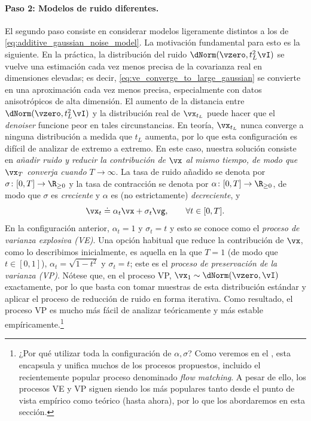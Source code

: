 \documentclass[../../book-main.tex]{subfiles}
\begin{document}
\paragraph{Paso 2: Modelos de ruido diferentes.} El segundo paso consiste en
considerar modelos ligeramente distintos a los de
\eqref{eq:additive_gaussian_noise_model}. La motivación fundamental para
esto es la siguiente. En la práctica, la distribución del ruido
\(\dNorm(\vzero, t_{L}^{2}\vI)\) se vuelve una estimación cada vez
menos precisa de la covarianza real en dimensiones elevadas; es decir,
\eqref{eq:ve_converge_to_large_gaussian} se convierte en una aproximación cada vez
menos precisa, especialmente con datos anisotrópicos de alta dimensión.
El aumento de la distancia entre \(\dNorm(\vzero, t_{L}^{2}\vI)\)
y la distribución real de \(\vx_{t_{L}}\) puede hacer que el \textit{denoiser}
funcione peor en tales circunstancias. En teoría,
\(\vx_{t_{L}}\) nunca converge a ninguna distribución a medida que \(t_{L}\)
aumenta, por lo que esta configuración es difícil de analizar de extremo a extremo. En este
caso, nuestra solución consiste en \textit{añadir ruido y reducir
    la contribución de \(\vx\) al mismo tiempo, de modo que \(\vx_{T}\) converja cuando \(T \to \infty\)}. 
La tasa de ruido añadido se denota por \(\sigma \colon [0, T] \to \R_{\geq 0}\) y la tasa de 
contracción se denota por \(\alpha \colon [0, T] \to \R_{\geq 0}\), de modo que \(\sigma\) es
\textit{creciente} y \(\alpha\) es (no estrictamente) \textit{decreciente}, y
\begin{equation}\label{eq:gen_additive_gaussian_noise_model}
    \vx_{t} \doteq \alpha_{t}\vx + \sigma_{t}\vg, \qquad \forall t \in [0, T].
\end{equation}
En la configuración anterior, \(\alpha_{t} = 1\) y \(\sigma_{t} = t\) y
esto se conoce como el \textit{proceso de varianza explosiva (VE)}. Una
opción habitual que reduce la contribución de \(\vx\), como lo
describimos inicialmente, es aquella en la que \(T = 1\) (de modo que \(t \in [0, 1]\)),
\(\alpha_{t} = \sqrt{1 - t^{2}}\) y \(\sigma_{t} = t\); este es el
\textit{proceso de preservación de la varianza (VP)}. Nótese que, en el proceso VP,
\(\vx_{1} \sim \dNorm(\vzero, \vI)\) exactamente, por lo que basta con
tomar muestras de esta distribución estándar y aplicar el proceso de reducción 
de ruido en forma iterativa. Como
resultado, el proceso VP es mucho más fácil de analizar teóricamente y
más estable empíricamente.\footnote{¿Por qué utilizar toda la configuración de \(\alpha,
    \sigma\)? Como veremos en el
    , esta encapsula y
    unifica muchos de los procesos propuestos, incluido el recientemente popular
    proceso denominado \textit{flow matching}. A pesar de ello, los procesos VE y VP
    siguen siendo los más populares tanto desde el punto de vista empírico como teórico
(hasta ahora), por lo que los abordaremos en esta sección.}
\end{document}

